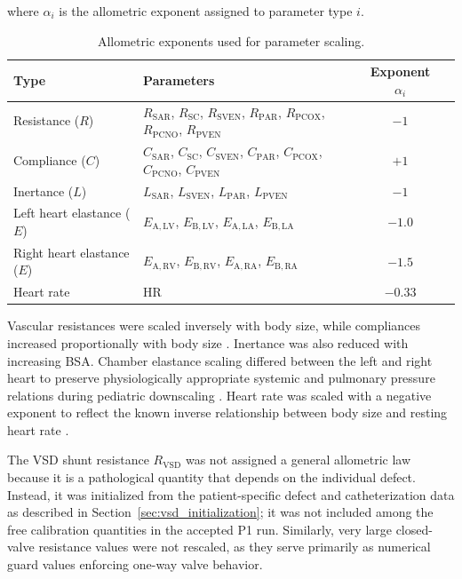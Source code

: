 \documentclass{article}
\begin{document}
\noindent where $\alpha_i$ is the allometric exponent assigned to parameter type $i$.

\begin{table}[ht]
\centering
\caption{Allometric exponents used for parameter scaling.}
\label{tab:scaling}
\begin{tabularx}{\linewidth}{>{\raggedright\arraybackslash}X >{\raggedright\arraybackslash}X cc}
\toprule
\textbf{Type} & \textbf{Parameters} & \textbf{Exponent} $\alpha_i$ \\
\midrule
Resistance ($R$) &
$R_\mathrm{SAR}$, $R_\mathrm{SC}$, $R_\mathrm{SVEN}$,
$R_\mathrm{PAR}$, $R_\mathrm{PCOX}$, $R_\mathrm{PCNO}$,
$R_\mathrm{PVEN}$ & $-1$ \\
Compliance ($C$) &
$C_\mathrm{SAR}$, $C_\mathrm{SC}$, $C_\mathrm{SVEN}$,
$C_\mathrm{PAR}$, $C_\mathrm{PCOX}$, $C_\mathrm{PCNO}$,
$C_\mathrm{PVEN}$ & $+1$ \\
Inertance ($L$) &
$L_\mathrm{SAR}$, $L_\mathrm{SVEN}$, $L_\mathrm{PAR}$,
$L_\mathrm{PVEN}$ & $-1$ \\
Left heart elastance ($E$) &
$E_{\mathrm{A},\mathrm{LV}}$, $E_{\mathrm{B},\mathrm{LV}}$,
$E_{\mathrm{A},\mathrm{LA}}$, $E_{\mathrm{B},\mathrm{LA}}$ & $-1.0$ \\
Right heart elastance ($E$) &
$E_{\mathrm{A},\mathrm{RV}}$, $E_{\mathrm{B},\mathrm{RV}}$,
$E_{\mathrm{A},\mathrm{RA}}$, $E_{\mathrm{B},\mathrm{RA}}$ & $-1.5$ \\
Heart rate &
HR & $-0.33$ \\
\bottomrule
\end{tabularx}
\end{table}

Vascular resistances were scaled inversely with body size, while compliances increased proportionally with body size \cite{Lundquist2025}. Inertance was also reduced with increasing BSA. Chamber elastance scaling differed between the left and right heart to preserve physiologically appropriate systemic and pulmonary pressure relations during pediatric downscaling \cite{Lundquist2025}. Heart rate was scaled with a negative exponent to reflect the known inverse relationship between body size and resting heart rate \cite{Lundquist2025}.

The VSD shunt resistance $R_\mathrm{VSD}$ was not assigned a general allometric law because it is a pathological quantity that depends on the individual defect. Instead, it was initialized from the patient-specific defect and catheterization data as described in Section~\ref{sec:vsd_initialization}; it was not included among the free calibration quantities in the accepted P1 run. Similarly, very large closed-valve resistance values were not rescaled, as they serve primarily as numerical guard values enforcing one-way valve behavior.
\end{document}

